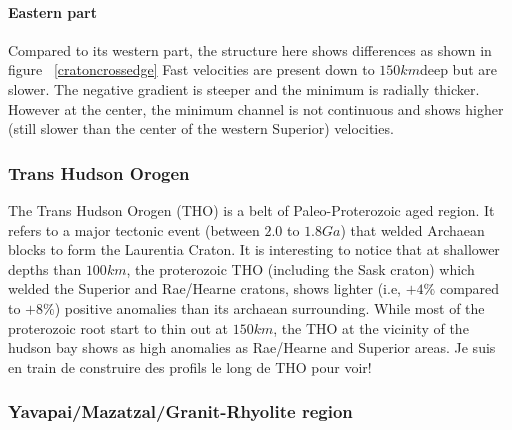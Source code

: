 \documentclass[12pt]{article}
\begin{document}
		\paragraph{Eastern part}



		Compared to its western part, the structure here shows differences as shown in figure ~\ref{cratoncrossedge} 
		Fast velocities are present down to $150km$deep but are slower. 
		The negative gradient is steeper and the minimum is radially thicker. 
		However at the center, the minimum channel is not continuous and shows higher (still slower than the center of the western Superior) velocities.

\subsubsection{Trans Hudson Orogen}
	The Trans Hudson Orogen (THO) is a belt of Paleo-Proterozoic aged region. It refers to a major tectonic event (between $2.0$ to $1.8Ga$) that welded Archaean blocks to form the Laurentia Craton.
	It is interesting to notice that at shallower depths than $100km$, the proterozoic THO (including the Sask craton) which welded the Superior and Rae/Hearne cratons, shows lighter (i.e, $+4\%$ compared to $+8\%$) positive anomalies than its archaean surrounding. While most of the proterozoic root start to thin out at $150km$, the THO at the vicinity of the hudson bay shows as high anomalies as Rae/Hearne and Superior areas. 
	Je suis en train de construire des profils le long de THO pour voir!

\subsubsection{Yavapai/Mazatzal/Granit-Rhyolite region}
\end{document}

